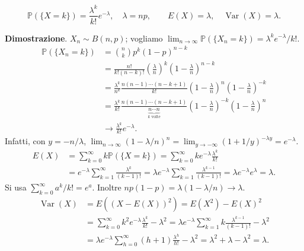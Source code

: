 \documentclass[11pt,a4paper]{article}
\begin{document}
\[\boxed{\mathbb P(\{X=k\})=\frac{\lambda^k}{k!}e^{-\lambda}},\quad\lambda=np,\qquad\boxed{E(X)=\lambda,\quad\operatorname{Var}(X)=\lambda}.\]
\begin{center}\end{center}
\textbf{Dimostrazione}. $X_n\sim B(n,p)$; vogliamo $\lim_{n\to\infty}\mathbb P(\{X_n=k\})=\lambda^ke^{-\lambda}/k!$.
\begin{align*}
\mathbb P(\{X_n=k\})&=\binom nkp^k(1-p)^{n-k}\\
&=\frac{n!}{k!(n-k)!}\left(\frac\lambda n\right)^k\left(1-\frac\lambda n\right)^{n-k}\\
&=\frac{\lambda^k}{n^k}\frac{n(n-1)\cdots(n-k+1)}{k!}\left(1-\frac\lambda n\right)^n\left(1-\frac\lambda n\right)^{-k}\\
&=\frac{\lambda^k}{k!}\frac{n(n-1)\cdots(n-k+1)}{\underbrace{n\cdots n}_{k\text{ volte}}}\left(1-\frac\lambda n\right)^{-k}\left(1-\frac\lambda n\right)^n\\
&\longrightarrow\frac{\lambda^k}{k!}e^{-\lambda}.
\end{align*}
Infatti, con $y=-n/\lambda$, $\lim_{n\to\infty}(1-\lambda/n)^n=\lim_{y\to-\infty}(1+1/y)^{-\lambda y}=e^{-\lambda}$.
\begin{align*}
E(X)&=\sum_{k=0}^\infty k\mathbb P(\{X=k\})=\sum_{k=0}^\infty ke^{-\lambda}\frac{\lambda^k}{k!}\\
&=e^{-\lambda}\sum_{k=1}^\infty\frac{\lambda^k}{(k-1)!}=\lambda e^{-\lambda}\sum_{k=1}^\infty\frac{\lambda^{k-1}}{(k-1)!}=\lambda e^{-\lambda}e^\lambda=\lambda.
\end{align*}
Si usa $\sum_{k=0}^\infty a^k/k!=e^a$. Inoltre $np(1-p)=\lambda(1-\lambda/n)\to\lambda$.
\begin{align*}
\operatorname{Var}(X)&=E((X-E(X))^2)=E(X^2)-E(X)^2\\
&=\sum_{k=0}^\infty k^2e^{-\lambda}\frac{\lambda^k}{k!}-\lambda^2
=\lambda e^{-\lambda}\sum_{k=1}^\infty k\frac{\lambda^{k-1}}{(k-1)!}-\lambda^2\\
&=\lambda e^{-\lambda}\sum_{h=0}^\infty(h+1)\frac{\lambda^h}{h!}-\lambda^2=\lambda^2+\lambda-\lambda^2=\lambda.
\end{align*}
\end{document}
